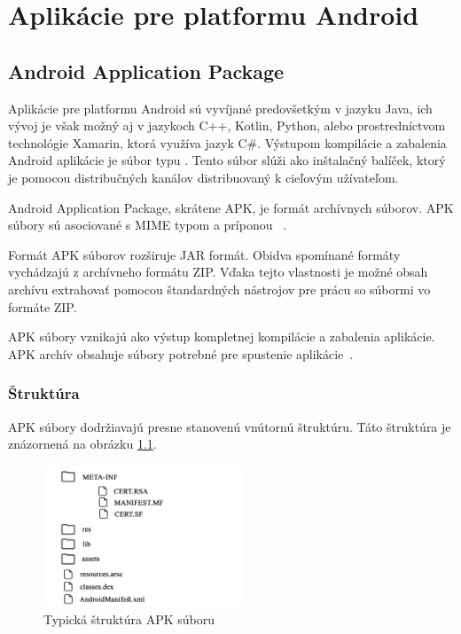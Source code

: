 \chapter{Aplikácie pre platformu Android}
\section{Android Application Package}
Aplikácie pre platformu Android sú vyvíjané predovšetkým v jazyku Java, ich vývoj je však možný aj v jazykoch C++, Kotlin, Python, alebo prostredníctvom technológie Xamarin, ktorá využíva jazyk C\#. Výstupom kompilácie a zabalenia Android aplikácie je súbor typu . Tento súbor slúži ako inštalačný balíček, ktorý je pomocou distribučných kanálov distribuovaný k cieľovým užívateľom.

Android Application Package, skrátene APK, je formát archívnych súborov. APK súbory sú asociované s MIME typom  a príponou ~\cite{IANA}. 

Formát APK súborov rozširuje JAR formát. Obidva spomínané formáty vychádzajú z archívneho formátu ZIP. Vďaka tejto vlastnosti je možné obsah archívu extrahovať pomocou štandardných nástrojov pre prácu so súbormi vo formáte ZIP.

APK súbory vznikajú ako výstup kompletnej kompilácie a zabalenia aplikácie. APK archív obsahuje súbory potrebné pre spustenie aplikácie~\cite{Allen2015}.

\subsection{Štruktúra}
\label{sec:struktura}
APK súbory dodržiavajú presne stanovenú vnútornú štruktúru. Táto štruktúra je znázornená na obrázku \ref{fig:strukturaApk}.

\begin{figure}[htb]
  \begin{center}
    \includegraphics[width=60mm]{images/apkStructure.pdf}
  \end{center}
  \caption{Typická štruktúra APK súboru}
  \label{fig:strukturaApk}
\end{figure}


